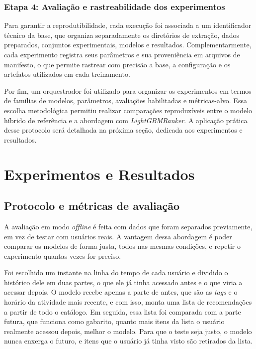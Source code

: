 \documentclass[a4paper,12pt]{article}
\begin{document}
{\subsubsection{Etapa 4: Avaliação e rastreabilidade dos experimentos}

Para garantir a reprodutibilidade, cada execução foi associada a um identificador técnico da base, que organiza separadamente os diretórios de extração, dados preparados, conjuntos experimentais, modelos e resultados. Complementarmente, cada experimento registra seus parâmetros e sua proveniência em arquivos de manifesto, o que permite rastrear com precisão a base, a configuração e os artefatos utilizados em cada treinamento.

Por fim, um orquestrador foi utilizado para organizar os experimentos em termos de famílias de modelos, parâmetros, avaliações habilitadas e métricas-alvo. Essa escolha metodológica permitiu realizar comparações reproduzíveis entre o modelo híbrido de referência e a abordagem com \textit{LightGBMRanker}. A aplicação prática desse protocolo será detalhada na próxima seção, dedicada aos experimentos e resultados.

\section{Experimentos e Resultados}

\subsection{Protocolo e métricas de avaliação}


A avaliação em modo \textit{offline} é feita com dados que foram separados previamente, em vez de testar com usuários reais. A vantagem dessa abordagem é poder comparar os modelos de forma justa, todos nas mesmas condições, e repetir o experimento quantas vezes for preciso.

Foi escolhido um instante na linha do tempo de cada usuário e dividido o histórico dele em duas partes, o que ele já tinha acessado antes e o que viria a acessar depois. O modelo recebe apenas a parte de antes, que são as \textit{tags} e o horário da atividade mais recente, e com isso, monta uma lista de recomendações a partir de todo o catálogo. Em seguida, essa lista foi comparada com a parte futura, que funciona como gabarito, quanto mais itens da lista o usuário realmente acessou depois, melhor o modelo. Para que o teste seja justo, o modelo nunca enxerga o futuro, e itens que o usuário já tinha visto são retirados da lista.

}
\end{document}
